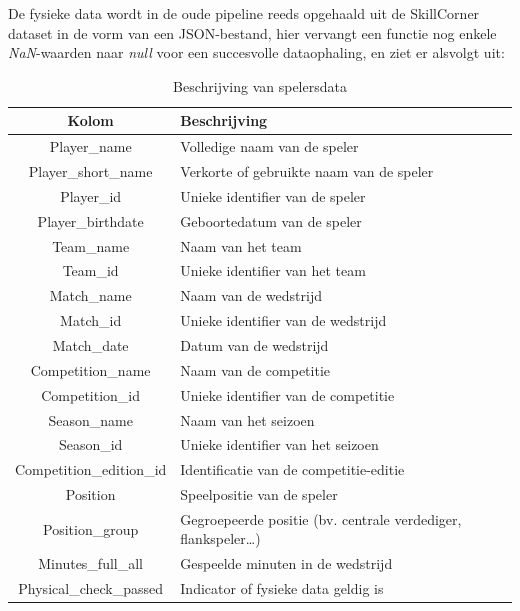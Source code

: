 De fysieke data wordt in de oude pipeline reeds opgehaald uit de SkillCorner dataset in de vorm van een JSON-bestand, hier vervangt een functie nog enkele \emph{NaN}-waarden naar \emph{null} voor een succesvolle dataophaling, en ziet er alsvolgt uit:
\begin{longtable}{ c | p{10cm} }
\caption{Beschrijving van spelersdata} \\
\hline
\textbf{Kolom} & \textbf{Beschrijving} \\
\hline

Player\_name & Volledige naam van de speler \\
Player\_short\_name & Verkorte of gebruikte naam van de speler \\
Player\_id & Unieke identifier van de speler \\
Player\_birthdate & Geboortedatum van de speler \\

Team\_name & Naam van het team \\
Team\_id & Unieke identifier van het team \\

Match\_name & Naam van de wedstrijd \\
Match\_id & Unieke identifier van de wedstrijd \\
Match\_date & Datum van de wedstrijd \\

Competition\_name & Naam van de competitie \\
Competition\_id & Unieke identifier van de competitie \\
Season\_name & Naam van het seizoen \\
Season\_id & Unieke identifier van het seizoen \\
Competition\_edition\_id & Identificatie van de competitie-editie \\

Position & Speelpositie van de speler \\
Position\_group & Gegroepeerde positie (bv. centrale verdediger, flankspeler\dots) \\

Minutes\_full\_all & Gespeelde minuten in de wedstrijd \\
Physical\_check\_passed & Indicator of fysieke data geldig is \\


\end{longtable}
